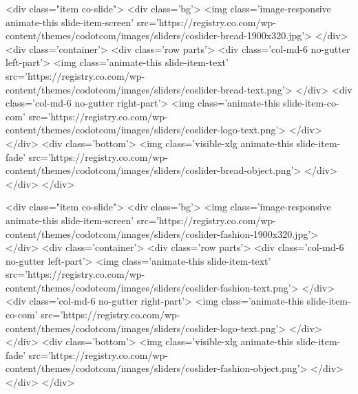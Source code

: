                 <div class="item co-slide">
                    <div class='bg'>
                        <img class='image-responsive animate-this slide-item-screen' src='https://registry.co.com/wp-content/themes/codotcom/images/sliders/coslider-bread-1900x320.jpg'>
                    </div>
                    <div class='container'>
                        <div class='row parts'>
                            <div class='col-md-6 no-gutter left-part'>
                                <img class='animate-this slide-item-text' src='https://registry.co.com/wp-content/themes/codotcom/images/sliders/coslider-bread-text.png'>
                            </div>
                            <div class='col-md-6 no-gutter right-part'>
                                <img class='animate-this slide-item-co-com' src='https://registry.co.com/wp-content/themes/codotcom/images/sliders/coslider-logo-text.png'>
                            </div>
                        </div>
                        <div class='bottom'>
                            <img class='visible-xlg animate-this slide-item-fade' src='https://registry.co.com/wp-content/themes/codotcom/images/sliders/coslider-bread-object.png'>
                        </div>
                    </div>
                </div>

                <div class="item co-slide">
                    <div class='bg'>
                        <img class='image-responsive animate-this slide-item-screen' src='https://registry.co.com/wp-content/themes/codotcom/images/sliders/coslider-fashion-1900x320.jpg'>
                    </div>
                    <div class='container'>
                        <div class='row parts'>
                            <div class='col-md-6 no-gutter left-part'>
                                <img class='animate-this slide-item-text' src='https://registry.co.com/wp-content/themes/codotcom/images/sliders/coslider-fashion-text.png'>
                            </div>
                            <div class='col-md-6 no-gutter right-part'>
                                <img class='animate-this slide-item-co-com' src='https://registry.co.com/wp-content/themes/codotcom/images/sliders/coslider-logo-text.png'>
                            </div>
                        </div>
                        <div class='bottom'>
                            <img class='visible-xlg animate-this slide-item-fade' src='https://registry.co.com/wp-content/themes/codotcom/images/sliders/coslider-fashion-object.png'>
                        </div>
                    </div>
                </div>

